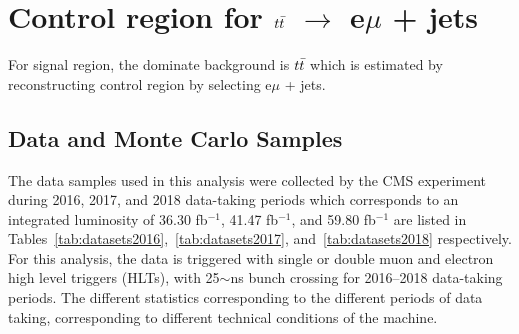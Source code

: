 \documentclass{cernatlasnote}
\begin{document}
\section{Control region for $t\Bar{t}$ $\rightarrow$ e$\mu$ + jets}
\label{APP: VALIDEMU}
For signal region, the dominate background is $t\Bar{t}$ which is estimated by reconstructing control region by selecting e$\mu$ + jets. 
\subsection{Data and Monte Carlo Samples}\label{sec:samples}
The data samples used in this analysis were collected by the CMS experiment during 2016, 2017, and 2018 data-taking periods which corresponds to an integrated luminosity of 36.30 fb$^{-1}$, 41.47 fb$^{-1}$, and 59.80 fb$^{-1}$ are listed in Tables~\ref{tab:datasets2016},~\ref{tab:datasets2017}, and~\ref{tab:datasets2018} respectively. For this analysis, the data is triggered with single or double muon and electron high level triggers (HLTs), with 25$\sim$ns bunch crossing for 2016--2018 data-taking periods. The different statistics corresponding to the different periods of data taking, corresponding to different technical conditions of the machine.


\end{document}
